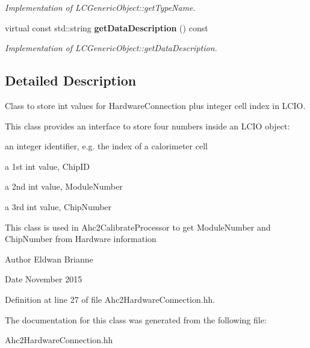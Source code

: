 \begin{DoxyCompactItemize}
\begin{DoxyCompactList}\small\item\em Implementation of L\-C\-Generic\-Object\-::get\-Type\-Name. \end{DoxyCompactList}\item 
virtual const std\-::string {\bf get\-Data\-Description} () const \label{classCALICE_1_1Ahc2HardwareConnection_a08a33f99895fb19ab59d07d6e3b46e3e}

\begin{DoxyCompactList}\small\item\em Implementation of L\-C\-Generic\-Object\-::get\-Data\-Description. \end{DoxyCompactList}\end{DoxyCompactItemize}


\subsection{Detailed Description}
Class to store int values for Hardware\-Connection plus integer cell index in L\-C\-I\-O. 

This class provides an interface to store four numbers inside an L\-C\-I\-O object\-:
\begin{DoxyItemize}
\item an integer identifier, e.\-g. the index of a calorimeter cell
\item a 1st int value, Chip\-I\-D
\item a 2nd int value, Module\-Number
\item a 3rd int value, Chip\-Number
\end{DoxyItemize}

This class is used in Ahc2\-Calibrate\-Processor to get Module\-Number and Chip\-Number from Hardware information

\begin{DoxyAuthor}{Author}
Eldwan Brianne 
\end{DoxyAuthor}
\begin{DoxyDate}{Date}
November 2015 
\end{DoxyDate}


Definition at line 27 of file Ahc2\-Hardware\-Connection.\-hh.



The documentation for this class was generated from the following file\-:\begin{DoxyCompactItemize}
\item 
Ahc2\-Hardware\-Connection.\-hh\end{DoxyCompactItemize}
